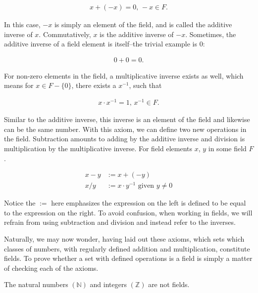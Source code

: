 \documentclass[twoside]{report}
\begin{document}
\begin{align*}
	x + (-x) = 0, \, -x \in F.
\end{align*}

In this case, $-x$ is simply an element of the field, and is called the additive inverse of $x$. Commutatively, $x$ is the additive inverse of $-x$. Sometimes, the additive inverse of a field element is itself--the trivial example is 0:

\begin{align*}
	0 + 0 = 0.
\end{align*}

For non-zero elements in the field, a multiplicative inverse exists as well, which means for $x \in F - \{ 0 \}$, there exists a $x^{-1}$, such that

\begin{align*}
	x \cdot x^{-1} = 1,\, x^{-1} \in F.
\end{align*}

Similar to the additive inverse, this inverse is an element of the field and likewise can be the same number. With this axiom, we can define two new operations in the field. Subtraction amounts to adding by the additive inverse and division is multiplication by the multiplicative inverse. For field elements $x$, $y$ in some field $F$.

\begin{align}
	x - y &:= x + (-y) \\
	x / y &:= x \cdot y^{-1} \text{ given } y \neq 0
\end{align}

Notice the $:=$ here emphasizes the expression on the left is defined to be equal to the expression on the right. To avoid confusion, when working in fields, we will refrain from using subtraction and division and instead refer to the inverses.

Naturally, we may now wonder, having laid out these axioms, which sets which classes of numbers, with regularly defined addition and multiplication, constitute fields. To prove whether a set with defined operations is a field is simply a matter of checking each of the axioms. \\

\vspace{\baselineskip}
\begin{theorem}
	The natural numbers $(\mathbb{N})$ and integers $(\mathbb{Z})$ are not fields. 
\end{theorem}
\end{document}
